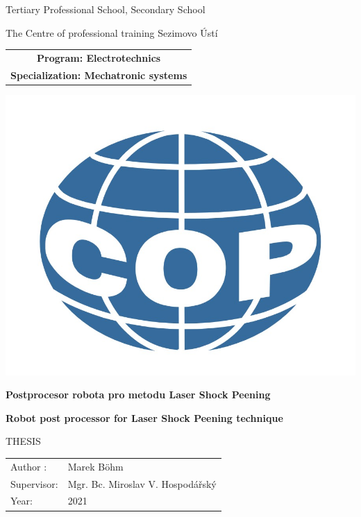 \documentclass[a4paper,twoside,12pt]{book}
\newcommand{\tb}{\textbf} %
\newcommand{\cvut}{Tertiary Professional School, Secondary School}
\newcommand{\fjfi}{The Centre of professional training Sezimovo Ústí}
\newcommand{\program}{Electrotechnics}
\newcommand{\obor}{Mechatronic systems} %
\newcommand{\druh}{Thesis} %
\newcommand{\logoCVUT}{\includegraphics{img/copsu_logo.jpg}} %
\newcommand{\nazevcz}{Postprocesor robota pro metodu Laser Shock Peening}    %
\newcommand{\nazeven}{Robot post processor for Laser Shock Peening technique}          %
\newcommand{\autor}{Marek Böhm}   %
\newcommand{\vedouci}{Mgr. Bc. Miroslav V. Hospodářský} %
\newcommand{\rok}{2021}  %
\begin{document}
\thispagestyle{empty}

\begin{center}
	{\LARGE
		\cvut\par
		\fjfi
	}
    \vspace{10mm}

    \begin{tabular}{c}
		\tb{Program: \program}  \\[3pt]   
		\tb{Specialization: \obor}\\
    \end{tabular}

   \vspace{10mm} \logoCVUT \vspace{15mm} 

   {\huge \tb{\nazevcz}\par}
   \vspace{5mm}   
   {\huge \tb{\nazeven}\par}
   
   \vspace{15mm}
   {\Large \MakeUppercase{\druh}}

   \vfill
   {\large
    \begin{tabular}{ll}
    Author : & \autor\\
    Supervisor: & \vedouci\\
    Year: & \rok
    \end{tabular}
   }
\end{center}

\clearpage{\pagestyle{empty}\cleardoublepage} %

\newpage  %
\thispagestyle{empty} %

%
%
%
\end{document}
